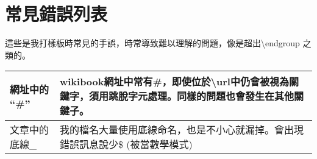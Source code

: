 \documentclass[class=NCU_thesis, crop=false]{standalone}
\begin{document}
\chapter{常見錯誤列表}
這些是我打樣板時常見的手誤，時常導致難以理解的問題，像是超出\textbackslash{}endgroup 之類的。

\begin{table}[h]
    \centering
    \begin{tabularx}{\textwidth}{| l | X |}
        \hline
        網址中的 ``\#'' & wikibook網址中常有\#，即使位於\textbackslash{}url中仍會被視為關鍵字，須用跳脫字元處理。同樣的問題也會發生在其他關鍵子。 \\ \hline
        文章中的底線\_  & 我的檔名大量使用底線命名，也是不小心就漏掉。會出現錯誤訊息說少\$ (被當數學模式) \\ \hline
    \end{tabularx}
\end{table}
\end{document}

